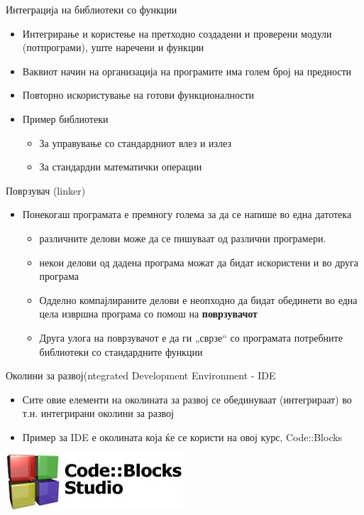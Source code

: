 \begin{frame}{Интеграција на библиотеки со функции}
\begin{itemize}
  \item Интегрирање и користење на претходно создадени и проверени модули (потпрограми), уште наречени и функции
  \item Ваквиот начин на организација на програмите има голем број на предности
  \item Повторно искористување на готови функционалности
  \item Пример библиотеки
  \begin{itemize}
    \item За управување со стандардниот влез и излез
    \item За стандардни математички операции 
  \end{itemize}
\end{itemize}
\end{frame}

\begin{frame}{Поврзувач (linker)}
\begin{itemize}
  \item Понекогаш програмата е премногу голема за да се напише во една датотека
  \begin{itemize}
    \item различните делови може да се пишуваат од различни програмери.
    \item некои делови од дадена програма можат да бидат искористени и во друга програма 
    \item Одделно компајлираните делови е неопходно да бидат обединети во една
    цела извршна програма со помош на \textbf{поврзувачот}
    \item Друга улога на поврзувачот е да ги „сврзе“ со програмата потребните
     библиотеки со стандардните функции
  \end{itemize}
\end{itemize}

\end{frame}

\begin{frame}{Околини за развој}{(ntegrated Development Environment - IDE}
\begin{itemize}
  \item Сите овие елементи на околината за развој се обединуваат (интегрираат)
  во т.н. интегрирани околини за развој
  \item Пример за IDE е околината која ќе се користи на овој курс, Code::Blocks
\end{itemize}
\begin{center}
\includegraphics[scale=0.5]{images/cb_logo}
\end{center}
\end{frame}

